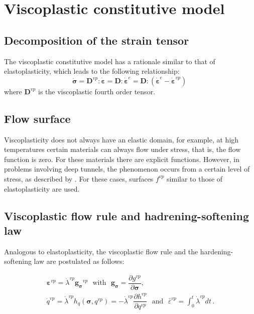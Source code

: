 \documentclass[Journal,letterpaper]{ascelike-new}
\newcommand{\dgds}{\boldsymbol{g_\sigma}}
\newcommand{\Dsdee}{\boldsymbol{D}}
\newcommand{\Dsdev}{\boldsymbol{D}^{vp}}
\newcommand{\dstrain}{\boldsymbol{\dot{\varepsilon}}}
\newcommand{\dstraine}{\boldsymbol{\dot{\varepsilon}}^{e}}
\newcommand{\dstrainv}{\boldsymbol{\dot{\varepsilon}}^{vp}}
\newcommand{\dstress}{\boldsymbol{\dot{\sigma}}}
\newcommand{\hl}{{h_q}}
\newcommand{\strainvp}{\boldsymbol{\varepsilon}^{vp}}
\newcommand{\strainvpeq}{\bar \varepsilon^{vp}}
\newcommand{\stress}{\boldsymbol{\sigma}}
\begin{document}
\section{Viscoplastic constitutive model}

\subsection{Decomposition of the strain tensor}

The viscoplastic constitutive model has a rationale similar to that of elastoplasticity, which leads to the following relationship:
\begin{equation} \label{eq_constitutive_relationship_viscoplastic}
	\dstress = \Dsdev : \dstrain = \Dsdee : \dstraine = \Dsdee : (\dstraine - \dstrainv)\;
\end{equation}
where $\Dsdev$ is the viscoplastic fourth order tensor.

\subsection{Flow surface}

Viscoplasticity does not always have an elastic domain, for example, at high temperatures certain materials can always flow under stress, that is, the flow function is zero. For these materials there are explicit functions. However, in problems involving deep tunnels, the phenomenon occurs from a certain level of stress, as described by . For these cases, surfaces $f^{vp}$ similar to those of elastoplasticity are used.

\subsection{Viscoplastic flow rule and hadrening-softening law}

Analogous to elastoplasticity, the viscoplastic flow rule and the hardening-softening law are postulated as follows:

\begin{equation} \label{eq_plastic_flow_rule}
	\begin{array}{lcl}
		\strainvp = \dot \lambda^{vp} \dgds^{vp} ~~~ \text{with} ~~~ \dgds = \dfrac{\partial g^{vp}}{\partial \stress}, \\ 
		\dot q^{vp} = \dot \lambda^{vp} \hl(\stress,q^{vp}) = - \dot \lambda^{vp} \dfrac{\partial h^{vp}}{\partial q^{vp}} ~~~\text{and} ~~~ \strainvpeq = \int_{0}^{t} \dot \lambda^{vp} dt  \,.
	\end{array}
\end{equation}
\end{document}

